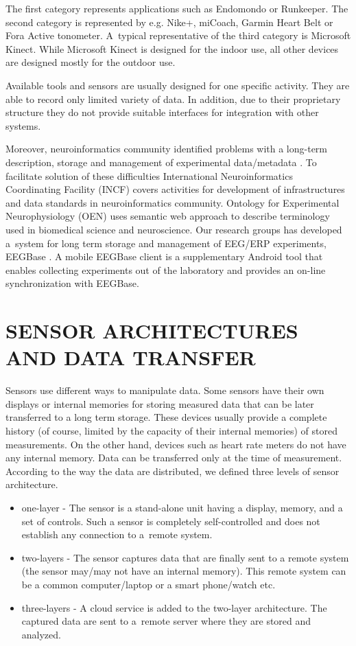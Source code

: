 \documentclass[a4paper,twoside]{article}
\begin{document}
The first category represents applications such as Endomondo or Runkeeper. The second category is represented by e.g. Nike+, miCoach, Garmin Heart Belt or Fora Active tonometer. A~typical representative of the third category is Microsoft Kinect. While Microsoft Kinect is designed for the indoor use, all other devices are designed mostly for the outdoor use.

Available tools and sensors are usually designed for one specific activity. They are able to record only limited variety of data. In addition, due to their proprietary structure they do not provide suitable interfaces for integration with other systems.

Moreover, neuroinformatics community identified problems with a long-term description, storage and management of experimental data/metadata \cite{CRCNS}. To facilitate solution of these difficulties International Neuroinformatics Coordinating Facility (INCF) \cite{INCF} covers activities for development of infrastructures and data standards in neuroinformatics community. Ontology for Experimental Neurophysiology (OEN) \cite{10.3389/conf.fninf.2014.18.00044} uses semantic web approach to describe terminology used in biomedical science and neuroscience.  Our research groups has developed a~system for long term storage and management of EEG/ERP experiments, EEGBase \cite{ISI:000306821100004}. A mobile EEGBase client \cite{10.3389/conf.fninf.2013.09.00046} is a supplementary Android tool that enables collecting experiments out of the laboratory and provides an on-line synchronization with EEGBase.


\section{\uppercase{Sensor Architectures and Data Transfer}}
\label{topology_data_transfer}

\noindent
Sensors use different ways to manipulate data. Some sensors have their own displays or internal memories for storing measured data that can be later transferred to a long term storage. These devices usually provide a complete history (of course, limited by the capacity of their internal memories) of stored measurements. On the other hand, devices such as heart rate meters do not have any internal memory. Data can be transferred only at the time of measurement. According to the way the data are distributed, we defined three levels of sensor architecture.

\begin{itemize}
 \item one-layer - The sensor is a stand-alone unit having a display, memory, and a set of controls. Such a sensor is completely self-controlled and does not establish any connection to a~remote system.
 \item two-layers - The sensor captures data that are finally sent to a remote system (the sensor may/may not have an internal memory). This remote system can be a common computer/laptop or a smart phone/watch etc.
 \item three-layers - A cloud service is added to the two-layer architecture. The captured data are sent to a~remote server where they are stored and analyzed.
\end{itemize}
\end{document}
